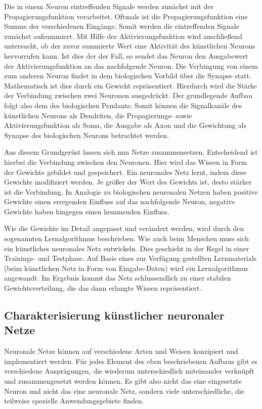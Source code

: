 Die in einem Neuron eintreffenden Signale werden zunächst mit der Propagierungsfunktion verarbeitet. Oftmals ist die Propagierungsfunktion eine Summe der verschiedenen Eingänge. Somit werden die eintreffenden Signale zunächst aufsummiert. Mit Hilfe der Aktivierungsfunktion wird anschließend untersucht, ob der zuvor summierte Wert eine Aktivität des künstlichen Neurons hervorrufen kann. Ist dies der der Fall, so sendet das Neuron den Ausgabewert der Aktivierungsfunktion an das nachfolgende Neuron. Die Verbingung von einem zum anderen Neuron findet in dem biologischen Vorbild über die Synapse statt. Mathematisch ist dies durch ein Gewicht repräsentiert. Hierdurch wird die Stärke der Verbindung zwischen zwei Neuronen ausgedrückt. Der grundlegende Aufbau folgt also dem des biologischen Pendants: Somit können die Signalkanäle des künstlichen Neurons als Dendriten, die Propagierungs- sowie Aktivierungsfunktion als Soma, die Ausgabe als Axon und die Gewichtung als Synapse des biologischen Neurons betrachtet werden.

Aus diesem Grundgerüst lassen sich nun Netze zusammensetzen. Entscheidend ist hierbei die Verbindung zwischen den Neuronen. Hier wird das Wissen in Form der Gewichte gebildet und gespeichert. Ein neuronales Netz lernt, indem diese Gewichte modifiziert werden. Je größer der Wert des Gewichts ist, desto stärker ist die Verbindung. In Analogie zu biologischen neuronalen Netzen haben positive Gewichte einen erregenden Einfluss auf das nachfolgende Neuron, negative Gewichte haben hingegen einen hemmenden Einfluss.

Wie die Gewichte im Detail angepasst und verändert werden, wird durch den sogenannten Lernalgorithmus beschrieben. Wie auch beim Menschen muss sich ein künstliches neuronales Netz entwickeln. Dies geschieht in der Regel in einer Trainings- und Testphase. Auf Basis eines zur Verfügung gestellten Lernmaterials (beim künstlichen Netz in Form von Eingabe-Daten) wird ein Lernalgorithmus angewandt. Im Ergebnis kommt das Netz schlussendlich zu einer stabilen Gewichtsverteilung, die das dann erlangte Wissen repräsentiert.



\subsection{Charakterisierung künstlicher neuronaler Netze}\label{sec:char}

Neuronale Netze können auf verschiedene Arten und Weisen konzipiert und implementiert werden. Für jedes Element des eben beschriebenen Aufbaus gibt es verschiedene Ausprägungen, die wiederum unterschiedlich miteinander verknüpft und zusammengesetzt werden können. Es gibt also nicht das eine eingesetzte Neuron und nicht das eine neuronale Netz, sondern viele unterschiedliche, die teilweise spezielle Anwendungsgebiete finden.

